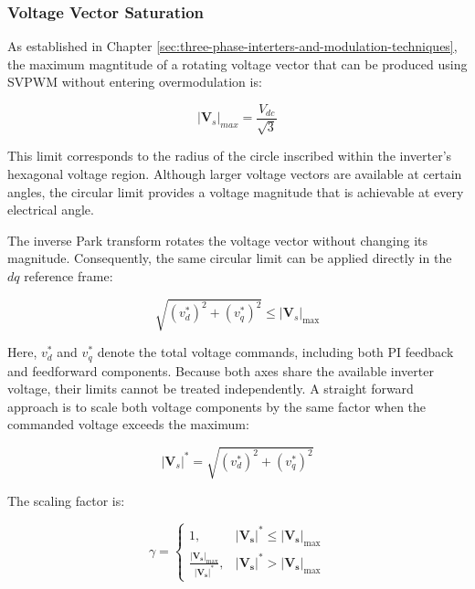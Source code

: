 \documentclass{article}
\begin{document}
\subsubsection{Voltage Vector Saturation}
\label{sec:voltage-vector-saturation}

As established in Chapter \ref{sec:three-phase-interters-and-modulation-techniques}, the maximum magntitude of a rotating voltage vector that can be produced using SVPWM without entering overmodulation is:

\begin{equation}
    |\mathbf{V}_s|_{max} = \frac{V_{dc}}{\sqrt{3}}
\end{equation}

This limit corresponds to the radius of the circle inscribed within the inverter's hexagonal voltage region. Although larger voltage vectors are available at certain angles, the circular limit provides a voltage magnitude that is achievable at every electrical angle. 

The inverse Park transform rotates the voltage vector without changing its magnitude. Consequently, the same circular limit can be applied directly in the $dq$ reference frame:

\begin{equation}
    \sqrt{(v_d^*)^2 + (v_q^*)^2} \leq |\mathbf{V}_s|_{\max}
\end{equation}

Here, $v_d^*$ and $v_q^*$ denote the total voltage commands, including both PI feedback and feedforward components. Because both axes share the available inverter voltage, their limits cannot be treated independently. A straight forward approach is to scale both voltage components by the same factor when the commanded voltage exceeds the maximum:

\begin{equation}
    |\mathbf{V}_s|^* = \sqrt{(v_d^*)^2 + (v_q^*)^2}
\end{equation}

The scaling factor is:

\begin{equation}
    \gamma =
    \begin{cases}
        1, & |\mathbf{V_s}|^* \leq |\mathbf{V_s}|_{\max} \\[4pt]
        \displaystyle\frac{|\mathbf{V_s}|_{\max}}{|\mathbf{V_s}|^*},
        & |\mathbf{V_s}|^* > |\mathbf{V_s}|_{\max}
    \end{cases}
\end{equation}
\end{document}

